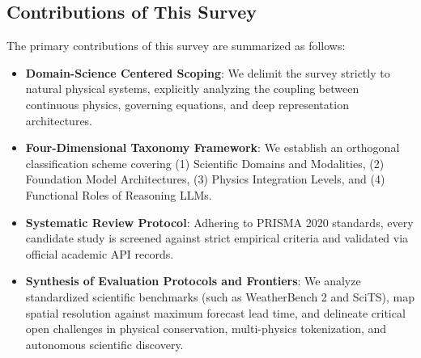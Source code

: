 \subsection{Contributions of This Survey}
The primary contributions of this survey are summarized as follows:
\begin{itemize}
    \item \textbf{Domain-Science Centered Scoping}: We delimit the survey strictly to natural physical systems, explicitly analyzing the coupling between continuous physics, governing equations, and deep representation architectures.
    \item \textbf{Four-Dimensional Taxonomy Framework}: We establish an orthogonal classification scheme covering (1) Scientific Domains and Modalities, (2) Foundation Model Architectures, (3) Physics Integration Levels, and (4) Functional Roles of Reasoning LLMs.
    \item \textbf{Systematic Review Protocol}: Adhering to PRISMA 2020 standards, every candidate study is screened against strict empirical criteria and validated via official academic API records.
    \item \textbf{Synthesis of Evaluation Protocols and Frontiers}: We analyze standardized scientific benchmarks (such as WeatherBench 2 and SciTS), map spatial resolution against maximum forecast lead time, and delineate critical open challenges in physical conservation, multi-physics tokenization, and autonomous scientific discovery.
\end{itemize}
